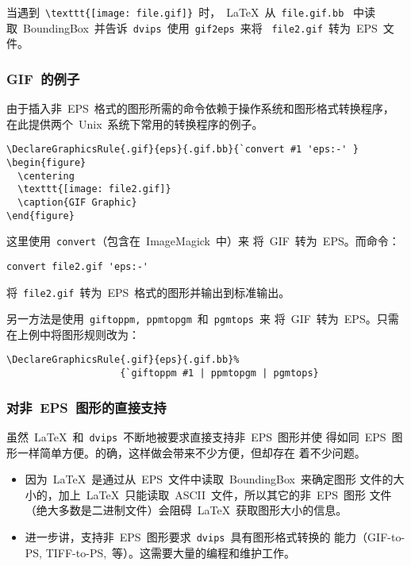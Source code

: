 当遇到~\verb+\texttt{[image: file.gif]}+~时，~\LaTeX{}~从~\texttt{file.gif.bb}~
中读取~BoundingBox~并告诉~\texttt{dvips}~使用~\texttt{gif2eps}~来将
~\texttt{file2.gif}~转为~EPS~文件。

\subsubsection{GIF~的例子}

由于插入非~EPS~格式的图形所需的命令依赖于操作系统和图形格式转换程序，
在此提供两个~Unix~系统下常用的转换程序的例子。

\begin{Verbatim}[xleftmargin=1cm]
\DeclareGraphicsRule{.gif}{eps}{.gif.bb}{`convert #1 'eps:-' }
\begin{figure}
  \centering
  \texttt{[image: file2.gif]}
  \caption{GIF Graphic}
\end{figure}
\end{Verbatim}
这里使用~\texttt{convert}（包含在~ImageMagick~中）来
将~GIF~转为~EPS。而命令：
\begin{Verbatim}[xleftmargin=1cm]
convert file2.gif 'eps:-'
\end{Verbatim}
将~\texttt{file2.gif}~转为~EPS~格式的图形并输出到标准输出。

另一方法是使用~\texttt{giftoppm, ppmtopgm}~和~\texttt{pgmtops}~来
将~GIF~转为~EPS。只需在上例中将图形规则改为：
\begin{Verbatim}[xleftmargin=1cm]
\DeclareGraphicsRule{.gif}{eps}{.gif.bb}%
                    {`giftoppm #1 | ppmtopgm | pgmtops}
\end{Verbatim}

\clearpage

\subsubsection{对非~EPS~图形的直接支持}

虽然~\LaTeX{}~和~\texttt{dvips}~不断地被要求直接支持非~EPS~图形并使
得如同~EPS~图形一样简单方便。的确，这样做会带来不少方便，但却存在
着不少问题。

\begin{itemize}
\item 因为~\LaTeX{}~是通过从~EPS~文件中读取~BoundingBox~来确定图形
      文件的大小的，加上~\LaTeX{}~只能读取~ASCII~文件，所以其它的非~EPS~图形
      文件（绝大多数是二进制文件）会阻碍~\LaTeX{}~获取图形大小的信息。
\item 进一步讲，支持非~EPS~图形要求~\texttt{dvips}~具有图形格式转换的
      能力（GIF-to-PS, TIFF-to-PS,~等）。这需要大量的编程和维护工作。
\end{itemize}

